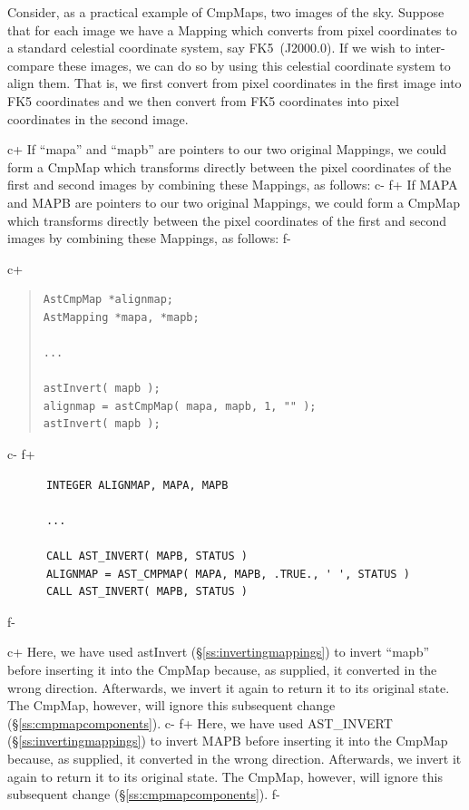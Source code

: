 \documentclass[twoside,11pt]{article}
\newcommand{\secref}[1]{\S\ref{#1}}
\newcommand{\secref}[1]{\ref{#1}}
\begin{document}
Consider, as a practical example of CmpMaps, two images of the
sky. Suppose that for each image we have a Mapping which converts from
pixel coordinates to a standard celestial coordinate system, say
FK5~(J2000.0). If we wish to inter-compare these images, we can do so
by using this celestial coordinate system to align them. That is, we
first convert from pixel coordinates in the first image into FK5
coordinates and we then convert from FK5 coordinates into pixel
coordinates in the second image.

c+
If ``mapa'' and ``mapb'' are pointers to our two original Mappings, we
could form a CmpMap which transforms directly between the pixel
coordinates of the first and second images by combining these
Mappings, as follows:
c-
f+
If MAPA and MAPB are pointers to our two original Mappings, we could
form a CmpMap which transforms directly between the pixel coordinates
of the first and second images by combining these Mappings, as
follows:
f-

c+
\begin{quote}
\small
\begin{verbatim}
AstCmpMap *alignmap;
AstMapping *mapa, *mapb;

...

astInvert( mapb );
alignmap = astCmpMap( mapa, mapb, 1, "" );
astInvert( mapb );
\end{verbatim}
\normalsize
\end{quote}
c-
f+
\small
\begin{verbatim}
      INTEGER ALIGNMAP, MAPA, MAPB

      ...

      CALL AST_INVERT( MAPB, STATUS )
      ALIGNMAP = AST_CMPMAP( MAPA, MAPB, .TRUE., ' ', STATUS )
      CALL AST_INVERT( MAPB, STATUS )
\end{verbatim}
\normalsize
f-

c+
Here, we have used astInvert (\secref{ss:invertingmappings}) to invert
``mapb'' before inserting it into the CmpMap because, as supplied, it
converted in the wrong direction. Afterwards, we invert it again to
return it to its original state. The CmpMap, however, will ignore this
subsequent change (\secref{ss:cmpmapcomponents}).
c-
f+
Here, we have used AST\_INVERT (\secref{ss:invertingmappings}) to
invert MAPB before inserting it into the CmpMap because, as supplied,
it converted in the wrong direction. Afterwards, we invert it again to
return it to its original state. The CmpMap, however, will ignore this
subsequent change (\secref{ss:cmpmapcomponents}).
f-
\end{document}
